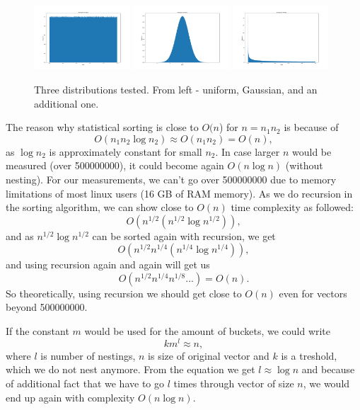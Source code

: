 \documentclass[12pt]{article}
\begin{document}
		\begin{figure}
		\begin{center}
			\includegraphics[width=0.32\textwidth]{fig_dist_norm}
			\includegraphics[width=0.32\textwidth]{fig_dist_gauss}
			\includegraphics[width=0.32\textwidth]{fig_dist_weird}
		\end{center}
		\caption{Three distributions tested. From left - uniform, Gaussian, and an additional one.}
		\label{fig4}
		\end{figure}		
						
		The reason why statistical sorting is close to $O(n$) for $n = n_1 n_2$ is because of
		\[
		O(n_1 n_2 \log n_2) \approx O(n_1 n_2) = O(n),
		\]
		as $\log n_2$ is approximately constant for small $n_2$. In case larger $n$ would be measured (over 500000000), it could become again $O(n \log n)$ (without nesting). For our measurements, we can't go over 500000000 due to memory limitations of most linux users (16 GB of RAM memory). 
		As we do recursion in the sorting algorithm, we can show close to $O(n)$ time complexity as followed:
		\[
		O(n^{1/2} (n^{1/2} \log n^{1/2})),
		\]
		and as $n^{1/2} \log n^{1/2}$ can be sorted again with recursion, we get
		\[
		O(n^{1/2} n^{1/4} (n^{1/4} \log n^{1/4})),
		\]
		and using recursion again and again will get us
		\[
		O(n^{1/2} n^{1/4} n^{1/8} ...) = O(n).
		\]
		So theoretically, using recursion we should get close to $O(n)$ even for vectors beyond 500000000.
        
        If the constant $m$ would be used for the amount of buckets, we could write
        \[
        k m^l \approx n, 
        \]
        where $l$ is number of nestings, $n$ is size of original vector and $k$ is a treshold, which we do not nest anymore. From the equation we get $l \approx \log n$ and because of additional fact that we have to go $l$ times through vector of size $n$, we would end up again with complexity $O(n \log n)$.
\end{document}

